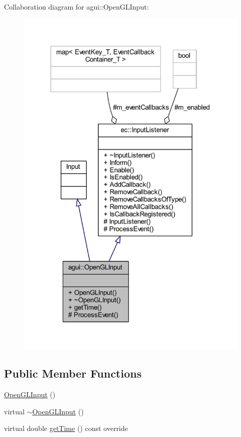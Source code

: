 Collaboration diagram for agui\+:\+:Open\+G\+L\+Input\+:
\nopagebreak
\begin{figure}[H]
\begin{center}
\leavevmode
\includegraphics[width=318pt]{classagui_1_1_open_g_l_input__coll__graph}
\end{center}
\end{figure}
\subsection*{Public Member Functions}
\begin{DoxyCompactItemize}
\item 
\mbox{\hyperlink{classagui_1_1_open_g_l_input_a39952038c9c55dd0096959aabdd1bcdd}{Open\+G\+L\+Input}} ()
\item 
virtual \mbox{\hyperlink{classagui_1_1_open_g_l_input_aea9e1ebeaad32419ad923654f96cc325}{$\sim$\+Open\+G\+L\+Input}} ()
\item 
virtual double \mbox{\hyperlink{classagui_1_1_open_g_l_input_afff68e181f8d772a642ecb8de48833db}{get\+Time}} () const override
\end{DoxyCompactItemize}
